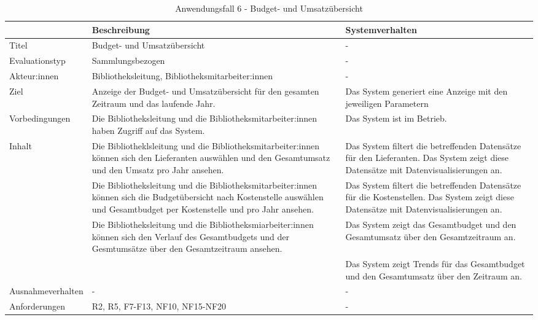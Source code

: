 \begingroup
\setlength{\tabcolsep}{10pt} %
\renewcommand{\arraystretch}{1.25} 
\begin{table}[h]
    \centering
    \begin{adjustbox}{max width=\textwidth}
    \begin{tabular}{lp{7.0cm}p{7.0cm}}
       \toprule
       \textbf{}          & \textbf{Beschreibung} &\textbf{Systemverhalten}\\
       \midrule
        Titel                            &Budget- und Umsatzübersicht& -\\
        Evaluationstyp                   &Sammlungsbezogen                   & -\\
        Akteur:innen                     &Bibliotheksleitung, Bibliotheksmitarbeiter:innen& -\\
        Ziel                             &Anzeige der Budget- und Umsatzübersicht für den gesamten Zeitraum und das laufende Jahr.& Das System generiert eine Anzeige mit den jeweiligen Parametern\\
        Vorbedingungen                   &Die Bibliotheksleitung und die Bibliotheksmitarbeiter:innen haben Zugriff auf das System.& Das System ist im Betrieb.\\
        Inhalt                &Die Bibliotheklsleitung und die Bibliotheksmitarbeiter:innen können sich den Lieferanten auswählen und den Gesamtumsatz und den Umsatz pro Jahr ansehen.& Das System filtert die betreffenden Datensätze für den Lieferanten. Das System zeigt diese Datensätze mit Datenvisualisierungen an.\\
                                         &Die Bibliotheksleitung und die Bibliotheksmitarbeiter:innen können sich die Budgetübersicht nach Kostenstelle auswählen und Gesamtbudget per Kostenstelle und pro Jahr ansehen. &Das System filtert die betreffenden Datensätze für die Kostenstellen. Das System zeigt diese Datensätze mit Datenvisualisierungen an.\\
                                         &Die Bibliotheksleitung und die Bibliotheksmiarbeiter:innen können sich den Verlauf des Gesamtbudgets und der Gesmtumsätze über den Gesamtzeitraum ansehen. &Das System zeigt das Gesamtbudget und den Gesamtumsatz über den Gesamtzeitraum an.\\
                                         & &Das System zeigt Trends für das Gesamtbudget und den Gesamtumsatz über den Zeitraum an.\\
        Ausnahmeverhalten               &- & -\\

        Anforderungen                   &R2, R5, F7-F13, NF10, NF15-NF20& -\\
        \bottomrule
    \end{tabular}
    \end{adjustbox}
    \caption{%
    Anwendungsfall 6 - Budget- und Umsatzübersicht   }
    \label{tab:AF_BudgetUmsatz}
    \end{table}
\endgroup


